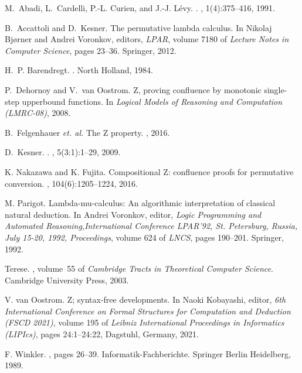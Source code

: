 \documentclass[a4paper]{article}
\begin{document}
% 
%
\small
\begin{thebibliography}{FNvOS16}

M.~Abadi, L.~Cardelli, P.-L. Curien, and J.-J. L{\'e}vy.
.
, 1(4):375--416, 1991.

B.~Accattoli and D.~Kesner.
\newblock The permutative lambda calculus.
\newblock In Nikolaj Bj{\o}rner and Andrei Voronkov, editors, {\em LPAR},
  volume 7180 of {\em Lecture Notes in Computer Science}, pages 23--36.
  Springer, 2012.

H.~P. Barendregt.
.
\newblock North Holland, 1984.

P.~Dehornoy and V.~van Oostrom.
\newblock Z, proving confluence by monotonic single-step upperbound functions.
\newblock In {\em Logical Models of Reasoning and Computation (LMRC-08)}, 2008.

B.~Felgenhauer {\it et. al.}
\newblock The {Z} property.
, 2016.

D.~Kesner.
.
, 5(3:1):1--29, 2009.

K. Nakazawa and K. Fujita.
\newblock Compositional {Z:} confluence proofs for permutative conversion.
, 104(6):1205--1224, 2016.

M. Parigot.
\newblock Lambda-mu-calculus: An algorithmic interpretation of classical
  natural deduction.
\newblock In Andrei Voronkov, editor, {\em Logic Programming and Automated
  Reasoning,International Conference LPAR'92, St. Petersburg, Russia, July
  15-20, 1992, Proceedings}, volume 624 of {\em LNCS}, pages 190--201. Springer, 1992.

Terese.
, volume~55 of {\em Cambridge Tracts in
  Theoretical Computer Science}.
\newblock Cambridge University Press, 2003.

V. {van Oostrom}.
\newblock Z; syntax-free developments.
\newblock In Naoki Kobayashi, editor, {\em 6th International Conference on
  Formal Structures for Computation and Deduction ({{FSCD}} 2021)}, volume 195 of {\em Leibniz International Proceedings in Informatics ({{LIPIcs}})}, pages 24:1--24:22, {Dagstuhl, Germany}, 2021. 

F. Winkler.
, pages
  26--39.
\newblock Informatik-Fachberichte. Springer Berlin Heidelberg, 1989.

\end{thebibliography}
\end{document}
